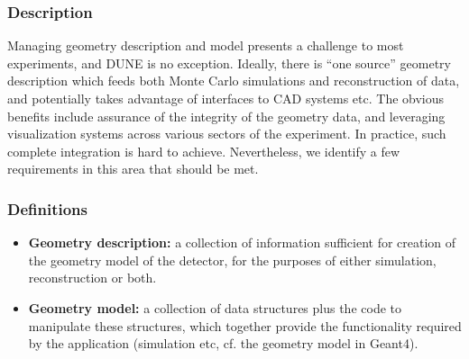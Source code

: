 \subsubsection{Description}

Managing geometry description and model presents a challenge to most experiments, and DUNE is no exception.
Ideally, there is ``one source'' geometry description which feeds both Monte Carlo simulations and reconstruction of data,
and potentially takes advantage of interfaces to CAD systems etc. The obvious benefits include assurance of the integrity
of the geometry data, and leveraging visualization systems across various sectors of the experiment. In practice, such complete
integration is hard to achieve. Nevertheless, we identify  a few requirements in this area that should be met.

\subsubsection{Definitions}
\begin{itemize}
	\item  \textbf{Geometry description:} a collection of information sufficient for creation of the geometry model of the detector,
	for the purposes of either simulation, reconstruction or both.

	\item  \textbf{Geometry model:} a collection of data structures plus the code to manipulate these structures,
	which together provide the functionality required by the application (simulation etc, cf. the geometry model in Geant4).
\end{itemize}

